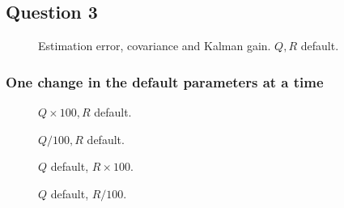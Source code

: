 \subsection{Question 3}

\begin{figure}[H]
	\scalebox{0.5}{}
	\scalebox{0.5}{}
	\scalebox{0.5}{}

	\caption{Estimation error, covariance and Kalman gain. $Q,R$ default.}
	\label{fig:q3:normal}
\end{figure}


\subsubsection{One change in the default parameters at a time}

\begin{figure}[H]
	\scalebox{0.5}{}
	\scalebox{0.5}{}
	\scalebox{0.5}{}

	\caption{$Q \times 100,R$ default.}
	\label{fig:q3:Qx100}
\end{figure}

\begin{figure}[H]
	\scalebox{0.5}{}
	\scalebox{0.5}{}
	\scalebox{0.5}{}

	\caption{$Q / 100,R$ default.}
	\label{fig:q3:Q-100}
\end{figure}

\begin{figure}[H]
	\scalebox{0.5}{}
	\scalebox{0.5}{}
	\scalebox{0.5}{}

	\caption{$Q$ default, $R \times 100$.}
	\label{fig:q3:Rx100}
\end{figure}

\begin{figure}[H]
	\scalebox{0.5}{}
	\scalebox{0.5}{}
	\scalebox{0.5}{}

	\caption{$Q$ default, $R / 100$.}
	\label{fig:q3:R-100}
\end{figure}


